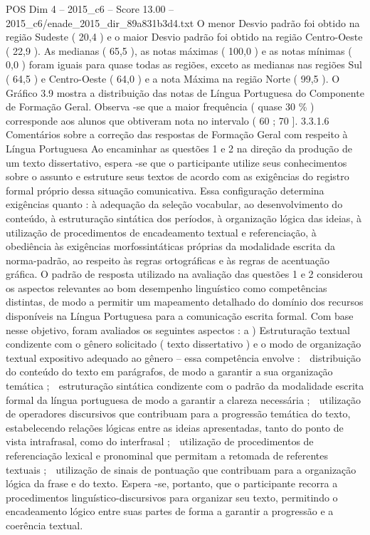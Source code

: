 \begin{textsample}{POS Dim 4 – 2015\_c6 – Score 13.00 – 2015\_c6/enade\_2015\_dir\_89a831b3d4.txt}
O menor Desvio padrão foi obtido na região Sudeste ( 20,4 ) e o maior Desvio padrão foi obtido na região Centro-Oeste ( 22,9 ).
As medianas ( 65,5 ), as notas máximas ( 100,0 ) e as notas mínimas ( 0,0 ) foram iguais para quase todas as regiões, exceto as medianas nas regiões Sul ( 64,5 ) e Centro-Oeste ( 64,0 ) e a nota Máxima na região Norte ( 99,5 ).
O Gráfico 3.9 mostra a distribuição das notas de Língua Portuguesa do Componente de Formação Geral.
Observa -se que a maior frequência ( quase 30 \% ) corresponde aos alunos que obtiveram nota no intervalo ( 60 ; 70 ]. 3.3.1.6 Comentários sobre a correção das respostas de Formação Geral com respeito à Língua Portuguesa Ao encaminhar as questões 1 e 2 na direção da produção de um texto dissertativo, espera -se que o participante utilize seus conhecimentos sobre o assunto e estruture seus textos de acordo com as exigências do registro formal próprio dessa situação comunicativa.
Essa configuração determina exigências quanto : à adequação da seleção vocabular, ao desenvolvimento do conteúdo, à estruturação sintática dos períodos, à organização lógica das ideias, à utilização de procedimentos de encadeamento textual e referenciação, à obediência às exigências morfossintáticas próprias da modalidade escrita da norma-padrão, ao respeito às regras ortográficas e às regras de acentuação gráfica.
O padrão de resposta utilizado na avaliação das questões 1 e 2 considerou os aspectos relevantes ao bom desempenho linguístico como competências distintas, de modo a permitir um mapeamento detalhado do domínio dos recursos disponíveis na Língua Portuguesa para a comunicação escrita formal.
Com base nesse objetivo, foram avaliados os seguintes aspectos : a ) Estruturação textual condizente com o gênero solicitado ( texto dissertativo ) e o modo de organização textual expositivo adequado ao gênero – essa competência envolve :  distribuição do conteúdo do texto em parágrafos, de modo a garantir a sua organização temática ;  estruturação sintática condizente com o padrão da modalidade escrita formal da língua portuguesa de modo a garantir a clareza necessária ;  utilização de operadores discursivos que contribuam para a progressão temática do texto, estabelecendo relações lógicas entre as ideias apresentadas, tanto do ponto de vista intrafrasal, como do interfrasal ;  utilização de procedimentos de referenciação lexical e pronominal que permitam a retomada de referentes textuais ;  utilização de sinais de pontuação que contribuam para a organização lógica da frase e do texto.
Espera -se, portanto, que o participante recorra a procedimentos linguístico-discursivos para organizar seu texto, permitindo o encadeamento lógico entre suas partes de forma a garantir a progressão e a coerência textual.

\end{textsample}
